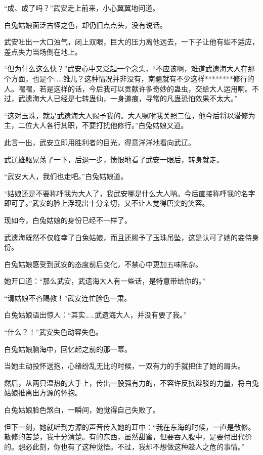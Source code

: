 \begin{this_body}
“成、成了吗？”武安走上前来，小心翼翼地问道。

白兔姑娘面泛古怪之色，却仍旧点点头，没有说话。

武安吐出一大口浊气，闭上双眼，巨大的压力离他远去，一下子让他有些不适应，差点失力当场倒在地上。

“但为什么这么快？”武安心中又泛起一个念头，“不应该啊，难道武遗海大人在那个方面，也是个……雏儿？这种情况并非没有，南疆就有不少这样********修行的人。嘿嘿，若是这样的话，今后我可以贡献许多奇妙的蛊虫，交给大人运用啊。不过，武遗海大人已经是七转蛊仙，一身道痕，寻常的凡蛊恐怕效果不太大。”

“这对玉珠，就是武遗海大人赐予我的。大人嘱咐我关照二位，他今后将以潜修为主，二位大人各行其职，不要打扰他修行。”白兔姑娘又道。

此言一出，武安立即用胜利者的目光，得意洋洋地看向武辽。

武辽雄躯晃荡了一下，后退一步，愤恨地看了武安一眼后，转身就走。

“武安大人，我们也走吧。”白兔姑娘道。

“姑娘还是不要称呼我为大人了，我武安哪是什么大人呐。今后直接称呼我的名字即可了。”武安的脸上浮现出十分亲切，又不让人觉得唐突的笑容。

现如今，白兔姑娘的身份已经不一样了。

武遗海既然不仅临幸了白兔姑娘，而且还赐予了玉珠吊坠，这是认可了她的妾侍身份。

白兔姑娘感受到武安的态度前后变化，不禁心中更加五味陈杂。

她开口道：“那么武安，武遗海大人有一些话，是特意带给你的。”

“请姑娘不吝赐教！”武安连忙脸色一肃。

白兔姑娘语出惊人：“其实……武遗海大人，并没有要了我。”

“什么？！”武安失色动容失色。

白兔姑娘脑海中，回忆起之前的那一幕。

当她主动投怀送抱，心绪纷乱无比的时候，一双有力的手就把住了她的肩头。

然后，从两只温热的大手上，传出一股强有力的，不容许反抗辩驳的力量，将白兔姑娘推离出方源的怀抱。

白兔姑娘脸色煞白，一瞬间，她觉得自己失败了。

但下一刻，她就听到方源的声音传入她的耳中：“我在东海的时候，一直是散修。散修的苦楚，我十分清楚。有的东西，虽然甜蜜，但要吞入腹中，是要付出代价的。想必此刻，你也有了这种觉悟。不过，我却不想做这种趁人之危的事情。”


\end{this_body}
